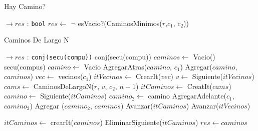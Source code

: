 \begin{Algoritmos}
\begin{algorithm}
\caption{Hay Camino?}
\begin{algorithmic}[1]
   $\to res$ : \texttt{bool} 
   \State $res \gets$ $\neg$ esVacio?(CaminosMinimos($r$,$c_1$, $c_2$))
\EndProcedure
\end{algorithmic}
\end{algorithm}


\begin{algorithm}
\caption{Caminos De Largo N}
\begin{algorithmic}[1]
   $\to res$ : \texttt{conj(secu(compu))} 
   \State conj(secu(compu)) $caminos \gets$ Vacio()
     \State secu(compus) $camino \gets$ Vacio
     \State AgregarAtras($camino$, $c_1$)
     \State Agregar($camino$, $caminos$)
   \Else
     \State $vec \gets$ vecinos($c_1$)
     \State $itVecinos \gets$ CrearIt($vec$)
       \State $v \gets$ Siguiente($itVecinos$)
       \State $cams \gets$ CaminosDeLargoN($r$, $v$, $c_2$, $n-1$)
       \State $itCaminos \gets$ CreatIt($cams$)
         \State $camino \gets$ Siguiente($itCaminos$)
           \State $camino_2 \gets$ camino
           \State AgregarAdelante($c_1$, $camino_2$)
           \State Agregar ($camino_2$, $caminos$)
         \EndIf
       \State Avanzar($itCaminos$)
       \EndWhile
    \State Avanzar($itVecinos$)
    \EndWhile    
   \EndIf
   
   \State $itCaminos \gets$ crearIt($caminos$)
       \State EliminarSiguiente($itCaminos$)
      \EndIf
    \EndWhile
    \State $res \gets caminos$

 \EndProcedure
\end{algorithmic}
\end{algorithm}


\end{Algoritmos}







